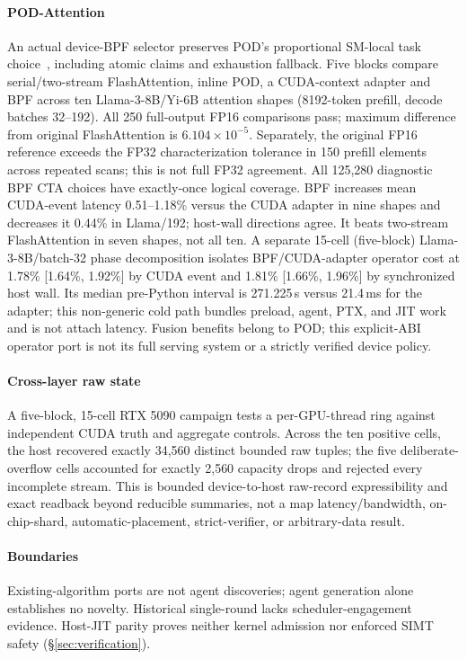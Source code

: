 \paragraph{POD-Attention}
An actual device-BPF selector preserves POD's proportional SM-local task
choice~\cite{kamath2025pod}, including atomic claims and exhaustion fallback.
Five blocks compare serial/two-stream FlashAttention, inline POD, a CUDA-context
adapter and BPF across ten Llama-3-8B/Yi-6B attention shapes
(8192-token prefill, decode batches 32--192). All 250 full-output FP16
comparisons pass; maximum difference from original FlashAttention is
$6.104\!\times\!10^{-5}$. Separately, the original FP16 reference exceeds
the FP32 characterization tolerance in 150 prefill elements across repeated
scans; this is not full FP32 agreement. All 125,280 diagnostic BPF CTA choices
have exactly-once logical coverage. BPF increases mean CUDA-event latency
0.51--1.18\% versus the CUDA adapter in nine shapes and decreases it 0.44\%
in Llama/192; host-wall directions agree. It beats two-stream FlashAttention
in seven shapes, not all ten. A separate 15-cell (five-block)
Llama-3-8B/batch-32 phase decomposition isolates BPF/CUDA-adapter operator
cost at 1.78\% [1.64\%, 1.92\%] by CUDA event and 1.81\% [1.66\%, 1.96\%]
by synchronized host wall. Its median pre-Python interval is 271.225\,s versus
21.4\,ms for the adapter; this non-generic cold path bundles preload, agent,
PTX, and JIT work and is not attach latency. Fusion benefits
belong to POD; this explicit-ABI operator port is not its full serving system
or a strictly verified device policy.

\paragraph{Cross-layer raw state}
A five-block, 15-cell RTX 5090 campaign tests a per-GPU-thread ring against
independent CUDA truth and aggregate controls. Across the ten positive cells,
the host recovered exactly 34,560 distinct bounded raw tuples; the five
deliberate-overflow cells accounted for exactly 2,560 capacity drops and
rejected every incomplete stream. This is bounded device-to-host raw-record
expressibility and exact readback beyond reducible summaries, not a map
latency/bandwidth, on-chip-shard, automatic-placement, strict-verifier, or
arbitrary-data result.

\paragraph{Boundaries}
Existing-algorithm ports are not agent discoveries; agent generation alone
establishes no novelty. Historical single-round 
lacks scheduler-engagement evidence. Host-JIT parity proves neither
kernel admission nor enforced SIMT safety (\S\ref{sec:verification}).
